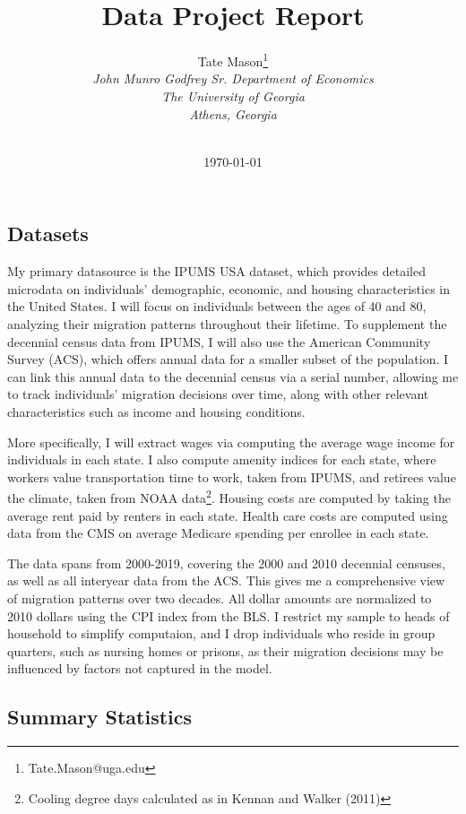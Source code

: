 \documentclass[11pt,a4paper]{article}
\title{Data Project Report}
\author{
    Tate Mason\thanks{Tate.Mason@uga.edu} \\
    \textit{John Munro Godfrey Sr. Department of Economics} \\
    \textit{The University of Georgia} \\
    \textit{Athens, Georgia} \\
    \\
}
\date{\today}
\begin{document}
\maketitle
\thispagestyle{empty}

\subsection{Datasets}
\label{subsec:datasets}

My primary datasource is the IPUMS USA dataset, which provides detailed microdata on individuals' demographic, economic, and housing characteristics in the United States. I will focus on individuals between the ages of 40 and 80, analyzing their migration patterns throughout their lifetime. To supplement the decennial census data from IPUMS, I will also use the American Community Survey (ACS), which offers annual data for a smaller subset of the population. I can link this annual data to the decennial census via a serial number, allowing me to track individuals' migration decisions over time, along with other relevant characteristics such as income and housing conditions.

More specifically, I will extract wages via computing the average wage income for individuals in each state. I also compute amenity indices for each state, where workers value transportation time to work, taken from IPUMS, and retirees value the climate, taken from NOAA data\footnote{Cooling degree days calculated as in Kennan and Walker (2011)}. Housing costs are computed by taking the average rent paid by renters in each state. Health care costs are computed using data from the CMS on average Medicare spending per enrollee in each state. 

The data spans from 2000-2019, covering the 2000 and 2010 decennial censuses, as well as all interyear data from the ACS. This gives me a comprehensive view of migration patterns over two decades. All dollar amounts are normalized to 2010 dollars using the CPI index from the BLS. I restrict my sample to heads of household to simplify computaion, and I drop individuals who reside in group quarters, such as nursing homes or prisons, as their migration decisions may be influenced by factors not captured in the model.

\subsection{Summary Statistics}
\label{subsec:summary_statistics}
\end{document}
